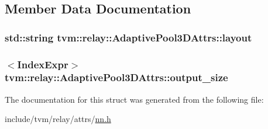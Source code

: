 \subsection{Member Data Documentation}
\subsubsection[{\texorpdfstring{layout}{layout}}]{\setlength{\rightskip}{0pt plus 5cm}std\+::string tvm\+::relay\+::\+Adaptive\+Pool3\+D\+Attrs\+::layout}\hypertarget{structtvm_1_1relay_1_1AdaptivePool3DAttrs_a4f75ae856def381f58402c5eff8c1027}{}\label{structtvm_1_1relay_1_1AdaptivePool3DAttrs_a4f75ae856def381f58402c5eff8c1027}
\subsubsection[{\texorpdfstring{output\+\_\+size}{output_size}}]{$<${\bf Index\+Expr}$>$ tvm\+::relay\+::\+Adaptive\+Pool3\+D\+Attrs\+::output\+\_\+size}\hypertarget{structtvm_1_1relay_1_1AdaptivePool3DAttrs_a0c56cb9665840dcc8e949c41d39c710d}{}\label{structtvm_1_1relay_1_1AdaptivePool3DAttrs_a0c56cb9665840dcc8e949c41d39c710d}


The documentation for this struct was generated from the following file\+:\begin{DoxyCompactItemize}
\item 
include/tvm/relay/attrs/\hyperlink{include_2tvm_2relay_2attrs_2nn_8h}{nn.\+h}\end{DoxyCompactItemize}
